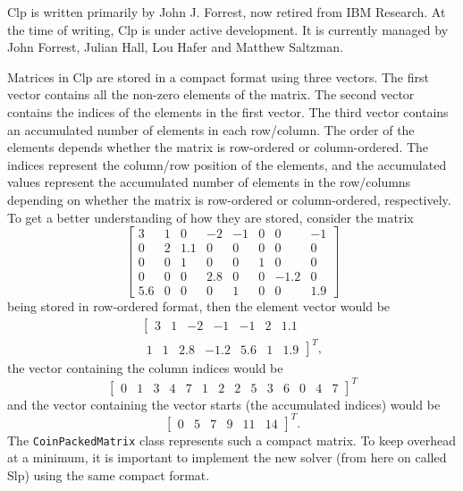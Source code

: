 Clp is written primarily by John J. Forrest, now retired from IBM Research. At
the time of writing, Clp is under active development. It is currently
managed by John Forrest, Julian Hall, Lou Hafer and Matthew Saltzman.
\cite{clppage}

Matrices in Clp are stored in a compact format using three vectors.
The first vector contains all the non-zero elements of the matrix.
The second vector contains the indices of the elements in the first vector.
The third vector contains an accumulated number of elements in each row/column.
The order of the elements depends whether the matrix is row-ordered or
column-ordered.
The indices represent the column/row position of the elements, and the
accumulated values represent the accumulated number of elements in the
row/columns depending on whether the matrix is row-ordered or column-ordered,
respectively.
To get a better understanding of how they are stored, consider the matrix
\[
\left[
\begin{array}{rrrrrrrr}
    3 & 1 & 0   & -2  & -1 & 0 & 0    & -1 \\
    0 & 2 & 1.1 & 0   & 0  & 0 & 0    & 0  \\
    0 & 0 & 1   & 0   & 0  & 1 & 0    & 0  \\
    0 & 0 & 0   & 2.8 & 0  & 0 & -1.2 & 0  \\
  5.6 & 0 & 0   & 0   & 1  & 0 & 0    & 1.9  

\end{array}
\right]
\]
being stored in row-ordered format, then the element vector would be
\[
\begin{array}{l}
\left[
\begin{array}{rrrrrrr}
    3 & 1 & -2 & -1 & -1 & 2 & 1.1
\end{array}\right. \\
\left.\begin{array}{rrrrrrr}
    1 & 1 & 2.8 & -1.2 & 5.6 & 1 & 1.9
\end{array}
\right]^T,
\end{array}
\]
the vector containing the column indices would be
\[
\left[
\begin{array}{rrrrrrrrrrrrrr}
    0 & 1 & 3 & 4 & 7 & 1 & 2 & 2 & 5 & 3 & 6 & 0 & 4 & 7
\end{array}
\right]^T
\]
and the vector containing the vector starts (the accumulated indices) would be
\[
\left[
\begin{array}{rrrrrr}
    0 & 5 & 7 & 9 & 11 & 14
\end{array}
\right]^T.
\]
The \texttt{CoinPackedMatrix} class represents such a compact matrix.
To keep overhead at a minimum, it is important to implement the new solver
(from here on called Slp) using the same compact format.

